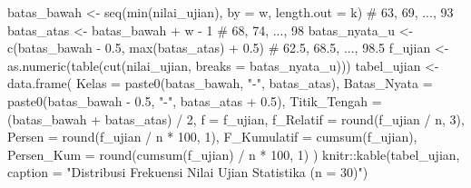 \documentclass[
  indonesian,
  letterpaper,
]{book}
\newenvironment{Shaded}{\begin{snugshade}}{\end{snugshade}}
\newcommand{\AttributeTok}[1]{\textcolor[rgb]{0.40,0.45,0.13}{#1}}
\newcommand{\CommentTok}[1]{\textcolor[rgb]{0.37,0.37,0.37}{#1}}
\newcommand{\DecValTok}[1]{\textcolor[rgb]{0.68,0.00,0.00}{#1}}
\newcommand{\FloatTok}[1]{\textcolor[rgb]{0.68,0.00,0.00}{#1}}
\newcommand{\FunctionTok}[1]{\textcolor[rgb]{0.28,0.35,0.67}{#1}}
\newcommand{\NormalTok}[1]{\textcolor[rgb]{0.00,0.23,0.31}{#1}}
\newcommand{\OtherTok}[1]{\textcolor[rgb]{0.00,0.23,0.31}{#1}}
\newcommand{\SpecialCharTok}[1]{\textcolor[rgb]{0.37,0.37,0.37}{#1}}
\newcommand{\StringTok}[1]{\textcolor[rgb]{0.13,0.47,0.30}{#1}}
\begin{document}
\begin{Shaded}
\begin{Highlighting}[]
\NormalTok{batas\_bawah }\OtherTok{\textless{}{-}} \FunctionTok{seq}\NormalTok{(}\FunctionTok{min}\NormalTok{(nilai\_ujian), }\AttributeTok{by =}\NormalTok{ w, }\AttributeTok{length.out =}\NormalTok{ k) }\CommentTok{\# 63, 69, ..., 93}
\NormalTok{batas\_atas }\OtherTok{\textless{}{-}}\NormalTok{ batas\_bawah }\SpecialCharTok{+}\NormalTok{ w }\SpecialCharTok{{-}} \DecValTok{1} \CommentTok{\# 68, 74, ..., 98}
\NormalTok{batas\_nyata\_u }\OtherTok{\textless{}{-}} \FunctionTok{c}\NormalTok{(batas\_bawah }\SpecialCharTok{{-}} \FloatTok{0.5}\NormalTok{, }\FunctionTok{max}\NormalTok{(batas\_atas) }\SpecialCharTok{+} \FloatTok{0.5}\NormalTok{) }\CommentTok{\# 62.5, 68.5, ..., 98.5}
\NormalTok{f\_ujian }\OtherTok{\textless{}{-}} \FunctionTok{as.numeric}\NormalTok{(}\FunctionTok{table}\NormalTok{(}\FunctionTok{cut}\NormalTok{(nilai\_ujian, }\AttributeTok{breaks =}\NormalTok{ batas\_nyata\_u)))}
\NormalTok{tabel\_ujian }\OtherTok{\textless{}{-}} \FunctionTok{data.frame}\NormalTok{(}
\AttributeTok{Kelas =} \FunctionTok{paste0}\NormalTok{(batas\_bawah, }\StringTok{"{-}"}\NormalTok{, batas\_atas),}
\AttributeTok{Batas\_Nyata =} \FunctionTok{paste0}\NormalTok{(batas\_bawah }\SpecialCharTok{{-}} \FloatTok{0.5}\NormalTok{, }\StringTok{"{-}"}\NormalTok{, batas\_atas }\SpecialCharTok{+} \FloatTok{0.5}\NormalTok{),}
\AttributeTok{Titik\_Tengah =}\NormalTok{ (batas\_bawah }\SpecialCharTok{+}\NormalTok{ batas\_atas) }\SpecialCharTok{/} \DecValTok{2}\NormalTok{,}
\AttributeTok{f =}\NormalTok{ f\_ujian,}
\AttributeTok{f\_Relatif =} \FunctionTok{round}\NormalTok{(f\_ujian }\SpecialCharTok{/}\NormalTok{ n, }\DecValTok{3}\NormalTok{),}
\AttributeTok{Persen =} \FunctionTok{round}\NormalTok{(f\_ujian }\SpecialCharTok{/}\NormalTok{ n }\SpecialCharTok{*} \DecValTok{100}\NormalTok{, }\DecValTok{1}\NormalTok{),}
\AttributeTok{F\_Kumulatif =} \FunctionTok{cumsum}\NormalTok{(f\_ujian),}
\AttributeTok{Persen\_Kum =} \FunctionTok{round}\NormalTok{(}\FunctionTok{cumsum}\NormalTok{(f\_ujian) }\SpecialCharTok{/}\NormalTok{ n }\SpecialCharTok{*} \DecValTok{100}\NormalTok{, }\DecValTok{1}\NormalTok{)}
\NormalTok{)}
\NormalTok{knitr}\SpecialCharTok{::}\FunctionTok{kable}\NormalTok{(tabel\_ujian, }\AttributeTok{caption =} \StringTok{"Distribusi Frekuensi Nilai Ujian Statistika (n = 30)"}\NormalTok{)}
\end{Highlighting}
\end{Shaded}
\end{document}
